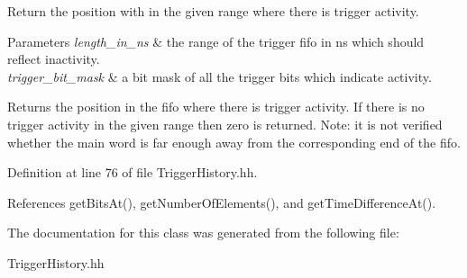 Return the position with in the given range where there is trigger activity. 


\begin{DoxyParams}{Parameters}
{\em length\-\_\-in\-\_\-ns} & the range of the trigger fifo in ns which should reflect inactivity. \\
\hline
{\em trigger\-\_\-bit\-\_\-mask} & a bit mask of all the trigger bits which indicate activity. \\
\hline
\end{DoxyParams}
\begin{DoxyReturn}{Returns}
the position in the fifo where there is trigger activity. If there is no trigger activity in the given range then zero is returned. Note\-: it is not verified whether the main word is far enough away from the corresponding end of the fifo. 
\end{DoxyReturn}


Definition at line 76 of file Trigger\-History.\-hh.



References get\-Bits\-At(), get\-Number\-Of\-Elements(), and get\-Time\-Difference\-At().



The documentation for this class was generated from the following file\-:\begin{DoxyCompactItemize}
\item 
Trigger\-History.\-hh\end{DoxyCompactItemize}
